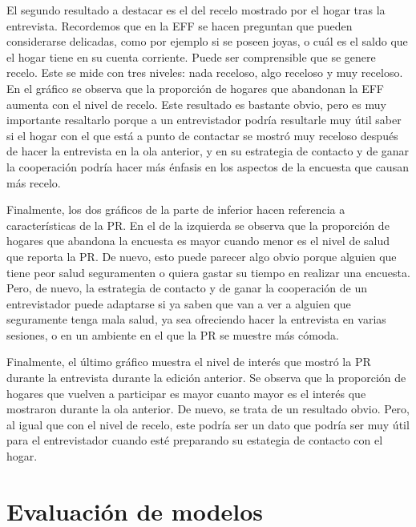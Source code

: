 El segundo resultado a destacar es el del recelo mostrado por el hogar tras la entrevista. Recordemos que en la EFF se hacen preguntan que pueden considerarse delicadas, como por ejemplo si se poseen joyas, o cuál es el saldo que el hogar tiene en su cuenta corriente. Puede ser comprensible que se genere recelo. Este se mide con tres niveles: nada receloso, algo receloso y muy receloso. En el gráfico se observa que la proporción de hogares que abandonan la EFF aumenta con el nivel de recelo. Este resultado es bastante obvio, pero es muy importante resaltarlo porque a un entrevistador podría resultarle muy útil saber si el hogar con el que está a punto de contactar se mostró muy receloso después de hacer la entrevista en la ola anterior, y en su estrategia de contacto y de ganar la cooperación podría hacer más énfasis en los aspectos de la encuesta que causan más recelo.

Finalmente, los dos gráficos de la parte de inferior hacen referencia a características de la PR. En el de la izquierda se observa que la proporción de hogares que abandona la encuesta es mayor cuando menor es el nivel de salud que reporta la PR. De nuevo, esto puede parecer algo obvio porque alguien que tiene peor salud seguramenten o quiera gastar su tiempo en realizar una encuesta. Pero, de nuevo, la estrategia de contacto y de ganar la cooperación de un entrevistador puede adaptarse si ya saben que van a ver a alguien que seguramente tenga mala salud, ya sea ofreciendo hacer la entrevista en varias sesiones, o en un ambiente en el que la PR se muestre más cómoda.

Finalmente, el último gráfico muestra el nivel de interés que mostró la PR durante la entrevista durante la edición anterior. Se observa que la proporción de hogares que vuelven a participar es mayor cuanto mayor es el interés que mostraron durante la ola anterior. De nuevo, se trata de un resultado obvio. Pero, al igual que con el nivel de recelo, este podría ser un dato que podría ser muy útil para el entrevistador cuando esté preparando su estategia de contacto con el hogar.

\section{Evaluación de modelos}

